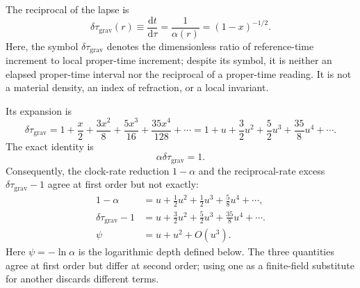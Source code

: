 \documentclass[12pt]{article}
\begin{document}
The reciprocal of the lapse is
\begin{equation}
  \delta\tau_{\mathrm{grav}}(r)\equiv\frac{\mathrm{d}t}{\mathrm{d}\tau}
  =\frac{1}{\alpha(r)}
  =\left(1-x\right)^{-1/2}.
  \label{eq:reciprocal-rate}
\end{equation}
Here, the symbol $\delta\tau_{\mathrm{grav}}$ denotes the dimensionless ratio of reference-time increment to local proper-time increment; despite its symbol, it is neither an elapsed proper-time interval nor the reciprocal of a proper-time reading. It is not a material density, an index of refraction, or a local invariant.

Its expansion is
\begin{equation}
  \delta\tau_{\mathrm{grav}}
  =1+\frac{x}{2}+\frac{3x^2}{8}+\frac{5x^3}{16}
    +\frac{35x^4}{128}+\cdots
  =1+u+\frac{3}{2}u^2+\frac{5}{2}u^3
    +\frac{35}{8}u^4+\cdots.
  \label{eq:reciprocal-series}
\end{equation}
The exact identity is
\begin{equation}
  \boxed{\alpha \delta\tau_{\mathrm{grav}}=1.}
  \label{eq:reciprocal-identity}
\end{equation}
Consequently, the clock-rate reduction $1-\alpha$ and the reciprocal-rate excess $\delta\tau_{\mathrm{grav}}-1$ agree at first order but not exactly:
\begin{align}
  1-\alpha
  &=u+\frac{1}{2}u^2+\frac{1}{2}u^3+\frac{5}{8}u^4+\cdots,
  \label{eq:rate-reduction}\\
  \delta\tau_{\mathrm{grav}}-1
  &=u+\frac{3}{2}u^2+\frac{5}{2}u^3+\frac{35}{8}u^4+\cdots.
  \label{eq:reciprocal-excess}\\
  \psi
  &=u+u^2+O(u^3).
  \label{eq:log-depth-second-order}
\end{align}
Here $\psi=-\ln\alpha$ is the logarithmic depth defined below. The three quantities agree at first order but differ at second order; using one as a finite-field substitute for another discards different terms.
\end{document}

